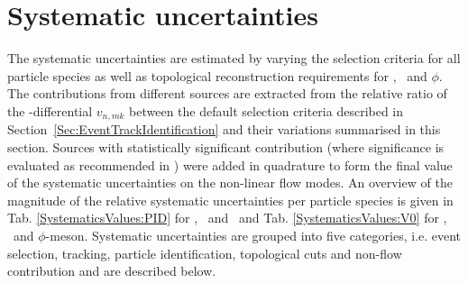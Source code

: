 \section{Systematic uncertainties}
\label{Sec:Systematics}

The systematic uncertainties are estimated by varying the selection criteria for all particle species as well as topological reconstruction requirements for \Ks, \lambdas~and $\phi$. The contributions from different sources are extracted from the relative ratio of the \pT-differential $v_{n,mk}$ between the default selection criteria described in Section~\ref{Sec:EventTrackIdentification} and their variations summarised in this section. Sources with statistically significant contribution (where significance is evaluated as recommended in \cite{Barlow:2002yb}) were added in quadrature to form the final value of the systematic uncertainties on the non-linear flow modes. 
An overview of the magnitude of the relative systematic uncertainties per particle species is given in Tab. \ref{SystematicsValues:PID} for \pion, \kaon~and \proton~and Tab. \ref{SystematicsValues:V0} for \Ks, \lambdas~and $\phi$-meson. Systematic uncertainties are grouped into five categories, i.e. event selection, tracking, particle identification, topological cuts and non-flow contribution and are described below.


